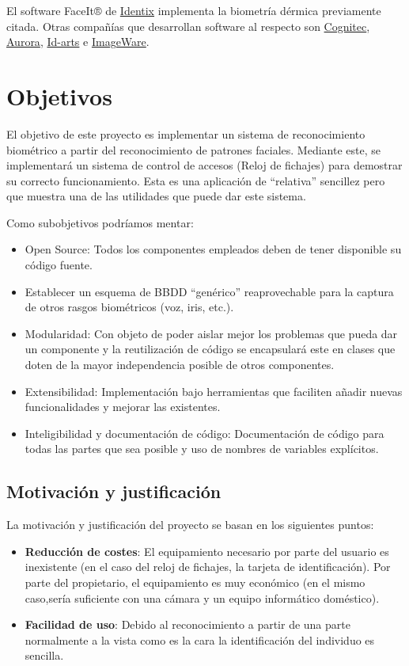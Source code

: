 El software FaceIt® de \href{http://www.l1id.com/}{Identix} implementa la biometría dérmica previamente citada. Otras compañías que desarrollan software al respecto son \href{http://www.cognitec.com}{Cognitec}, \href{http://www.facerec.com/}{Aurora}, \href{http://www.id-arts.com/}{Id-arts} e \href{http://www.iwsinc.com}{ImageWare}.


\section {Objetivos}
El objetivo de este proyecto es implementar un sistema de reconocimiento biométrico a partir del reconocimiento de patrones faciales. Mediante este, se implementará un sistema de control de accesos (Reloj de fichajes) para demostrar su correcto funcionamiento. Esta es una aplicación de ``relativa'' sencillez pero que muestra una de las utilidades que puede dar este sistema. 

Como subobjetivos podríamos mentar:
\begin{itemize}
	\item{Open Source: Todos los componentes empleados deben de tener disponible su código fuente.}
	\item{Establecer un esquema de BBDD ``genérico'' reaprovechable para la captura de otros rasgos biométricos (voz, iris, etc.). }
	\item{Modularidad: Con objeto de poder aislar mejor los problemas que pueda dar un componente y la reutilización de código se encapsulará este en clases que doten de la mayor independencia posible de otros componentes. }
	\item{Extensibilidad: Implementación bajo herramientas que faciliten añadir nuevas funcionalidades y mejorar las existentes. }
	\item{Inteligibilidad y documentación de código: Documentación de código para todas las partes que sea posible y uso de nombres de variables explícitos.}
\end{itemize}


\subsection{Motivación y justificación}
La motivación y justificación del proyecto se basan en los siguientes puntos:
\begin{itemize}
	\item{\textbf{Reducción de costes}:} El equipamiento necesario por parte del usuario es inexistente (en el caso del reloj de fichajes, la tarjeta de identificación). Por parte del propietario, el equipamiento es muy económico (en el mismo caso,sería suficiente con una cámara y un equipo informático doméstico).
	\item{\textbf{Facilidad de uso}:} Debido al reconocimiento a partir de una parte normalmente a la vista como es la cara la identificación del individuo es sencilla.
\end{itemize}


